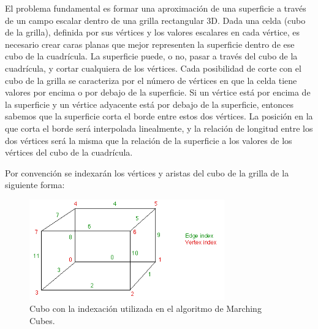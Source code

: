 \documentclass[12pt]{article}
\begin{document}
El problema fundamental es formar una aproximación de una superficie a través de un campo escalar dentro de una grilla rectangular 3D. Dada una celda (cubo de la grilla), definida por sus vértices y los valores escalares en cada vértice, es necesario crear caras planas que mejor representen la superficie dentro de ese cubo de la cuadrícula. La superficie puede, o no, pasar a través del cubo de la cuadrícula, y cortar cualquiera de los vértices. Cada posibilidad de corte con el cubo de la grilla se caracteriza por el número de vértices en que la celda tiene valores por encima o por debajo de la superficie. Si un vértice está por encima de la superficie y un vértice adyacente está por debajo de la superficie, entonces sabemos que la superficie corta el borde entre estos dos vértices. La posición en la que corta el borde será interpolada linealmente, y la relación de longitud entre los dos vértices será la misma que la relación de la superficie a los valores de los vértices del cubo de la cuadrícula.

Por convención se indexarán los vértices y aristas del cubo de la grilla de la siguiente forma:
\begin{figure}[h!]
\includegraphics[width=0.75\textwidth,center]{marchingcubes1.png}
\caption{Cubo con la indexación utilizada en el algoritmo de Marching Cubes.}
\end{figure}
\end{document}
